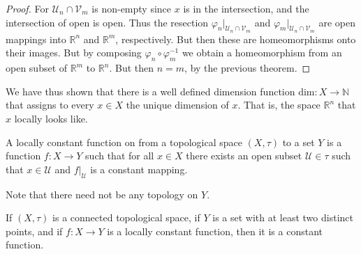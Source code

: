         \begin{proof}
            For $\mathcal{U}_{n}\cap\mathcal{V}_{m}$ is non-empty since $x$ is
            in the intersection, and the intersection of open is open. Thus the
            resection $\varphi_{n}|_{\mathcal{U}_{n}\cap\mathcal{V}_{m}}$ and
            $\varphi_{m}|_{\mathcal{U}_{n}\cap\mathcal{V}_{m}}$ are open
            mappings into $\mathbb{R}^{n}$ and $\mathbb{R}^{m}$, respectively.
            But then these are homeomorphisms onto their images. But by
            composing $\varphi_{n}\circ\varphi_{m}^{\minus{1}}$ we obtain a
            homeomorphism from an open subset of $\mathbb{R}^{m}$ to
            $\mathbb{R}^{n}$. But then $n=m$, by the previous theorem.
        \end{proof}
        We have thus shown that there is a well defined dimension function
        $\textrm{dim}:X\rightarrow\mathbb{N}$ that assigns to every $x\in{X}$
        the unique dimension of $x$. That is, the space $\mathbb{R}^{n}$ that
        $x$ locally looks like.
        \begin{definition}
            A locally constant function on from a topological space $(X,\tau)$
            to a set $Y$ is a function $f:X\rightarrow{Y}$ such that for all
            $x\in{X}$ there exists an open subset $\mathcal{U}\in\tau$ such that
            $x\in\mathcal{U}$ and $f|_{\mathcal{U}}$ is a constant mapping.
        \end{definition}
        Note that there need not be any topology on $Y$.
        \begin{theorem}
            If $(X,\tau)$ is a connected topological space, if $Y$ is a set with
            at least two distinct points, and if $f:X\rightarrow{Y}$ is a
            locally constant function, then it is a constant function.
        \end{theorem}
